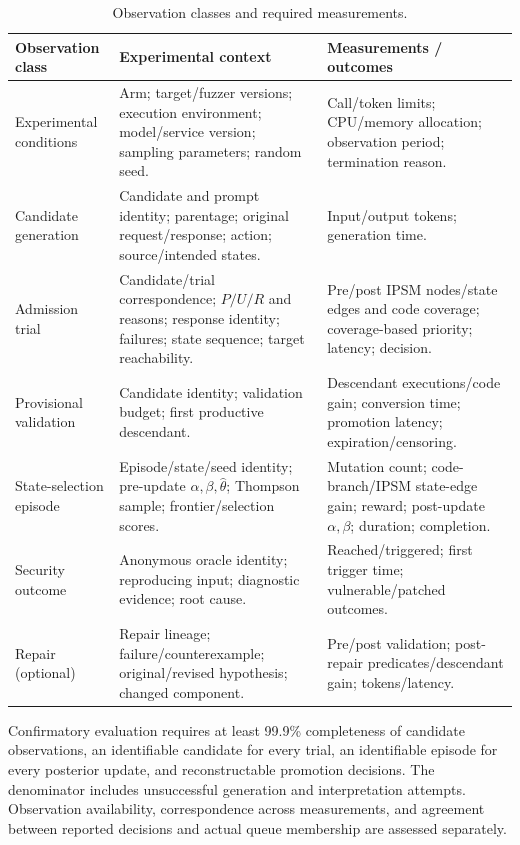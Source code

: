 \documentclass[final,5p,times,number]{elsarticle}
\begin{document}
\begin{table}[!tbp]
\centering\footnotesize
\caption{Observation classes and required measurements.}
\label{tab:events}
\begin{tabularx}{\textwidth}{@{}>{\raggedright\arraybackslash}p{} Y Y@{}}
\toprule
Observation class & Experimental context & Measurements / outcomes \\
\midrule
Experimental conditions & Arm; target/fuzzer versions; execution environment; model/service version; sampling parameters; random seed. & Call/token limits; CPU/memory allocation; observation period; termination reason. \\
Candidate generation & Candidate and prompt identity; parentage; original request/response; action; source/intended states. & Input/output tokens; generation time. \\
Admission trial & Candidate/trial correspondence; $P/U/R$ and reasons; response identity; failures; state sequence; target reachability. & Pre/post IPSM nodes/state edges and code coverage; coverage-based priority; latency; decision. \\
Provisional validation & Candidate identity; validation budget; first productive descendant. & Descendant executions/code gain; conversion time; promotion latency; expiration/censoring. \\
State-selection episode & Episode/state/seed identity; pre-update $\alpha,\beta,\widehat{\theta}$; Thompson sample; frontier/selection scores. & Mutation count; code-branch/IPSM state-edge gain; reward; post-update $\alpha,\beta$; duration; completion. \\
Security outcome & Anonymous oracle identity; reproducing input; diagnostic evidence; root cause. & Reached/triggered; first trigger time; vulnerable/patched outcomes. \\
Repair (optional) & Repair lineage; failure/counterexample; original/revised hypothesis; changed component. & Pre/post validation; post-repair predicates/descendant gain; tokens/latency. \\
\bottomrule
\end{tabularx}
\end{table}

Confirmatory evaluation requires at least 99.9\% completeness of candidate observations, an identifiable candidate for every trial, an identifiable episode for every posterior update, and reconstructable promotion decisions. The denominator includes unsuccessful generation and interpretation attempts. Observation availability, correspondence across measurements, and agreement between reported decisions and actual queue membership are assessed separately.
\end{document}
